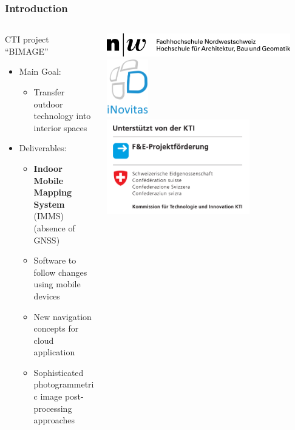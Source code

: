 \documentclass[aspectratio=169]{beamer}
\begin{document}
  \begin{frame}
   \frametitle{Introduction}
   \begin{columns}[onlytextwidth]

    \begin{column}{0.5\textwidth}
    CTI project ``BIMAGE''
      \begin{itemize}
       \item Main Goal: 
       \begin{itemize}\item Transfer outdoor technology into interior spaces\end{itemize}
       \pause
       \item Deliverables:
       \begin{itemize}
        \item \textbf{Indoor Mobile Mapping System} (IMMS) (absence of GNSS) \pause
        \item Software to follow changes using mobile devices \pause
        \item New navigation concepts for cloud application \pause
        \item Sophisticated photogrammetric image post-processing approaches 
       \end{itemize}
      \end{itemize}
    \end{column}
    \begin{column}{0.5\textwidth}
    \begin{center}
    \includegraphics[width=0.9\textwidth]{./Abbildungen/FHNW_HABG_10mm.jpg} \\
    \includegraphics[width=0.2\textwidth]{./Abbildungen/iNovitas_Logo.png} \\
    \includegraphics[width=0.7\textwidth]{./Abbildungen/F&E_Absender_Dritte_Un_D_1200.png}

\end{center}
\end{column}
\end{columns}
\end{frame}
\end{document}
